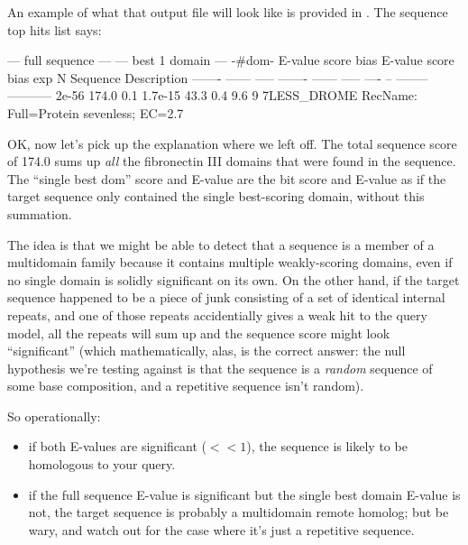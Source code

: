 An example of what that output file will look like is provided in
. The sequence top hits list says:

\begin{sreoutput}
   --- full sequence ---   --- best 1 domain ---    -#dom-
    E-value  score  bias    E-value  score  bias    exp  N  Sequence    Description
    ------- ------ -----    ------- ------ -----   ---- --  --------    -----------
      2e-56  174.0   0.1    1.7e-15   43.3   0.4    9.6  9  7LESS_DROME RecName: Full=Protein sevenless;          EC=2.7
\end{sreoutput}

OK, now let's pick up the explanation where we left off. The total
sequence score of 174.0 sums up \emph{all} the fibronectin III domains
that were found in the  sequence. The ``single best
dom'' score and E-value are the bit score and E-value as if the target
sequence only contained the single best-scoring domain, without this
summation.

The idea is that we might be able to detect that a sequence is a
member of a multidomain family because it contains multiple
weakly-scoring domains, even if no single domain is solidly
significant on its own.  On the other hand, if the target sequence
happened to be a piece of junk consisting of a set of identical
internal repeats, and one of those repeats accidentially gives a weak
hit to the query model, all the repeats will sum up and the sequence
score might look ``significant'' (which mathematically, alas, is the
correct answer: the null hypothesis we're testing against is that the
sequence is a \emph{random} sequence of some base composition, and a
repetitive sequence isn't random).

So operationally:
\begin{itemize}
\item if both E-values are significant ($<<1$), the sequence is likely
      to be homologous to your query.
\item if the full sequence E-value is significant but the single best domain
      E-value is not, the target sequence is probably a multidomain remote 
      homolog; but be wary, and watch out for the case where it's just a repetitive
      sequence.
\end{itemize}

